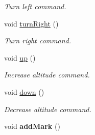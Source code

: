 \begin{DoxyCompactItemize}
\begin{DoxyCompactList}\small\item\em Turn left command. \end{DoxyCompactList}\item 
void \hyperlink{class_mission_control_a0b6dbf20da72a8b658735fcca7e0a642}{turn\-Right} ()
\begin{DoxyCompactList}\small\item\em Turn right command. \end{DoxyCompactList}\item 
void \hyperlink{class_mission_control_ae3af6a0bc14d2d1c51c95c7d0b272068}{up} ()
\begin{DoxyCompactList}\small\item\em Increase altitude command. \end{DoxyCompactList}\item 
void \hyperlink{class_mission_control_aa161256fdc16e01cca0057ce62eaad28}{down} ()
\begin{DoxyCompactList}\small\item\em Decrease altitude command. \end{DoxyCompactList}\item 
\hypertarget{class_mission_control_a95e917c3e0138d623ecbd82e1f19d7bb}{void {\bfseries add\-Mark} ()}\label{class_mission_control_a95e917c3e0138d623ecbd82e1f19d7bb}

\end{DoxyCompactItemize}
